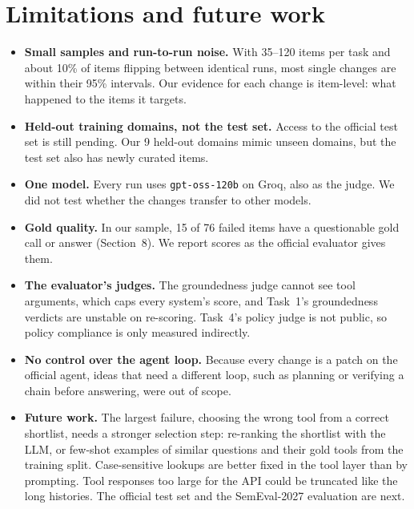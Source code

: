 \documentclass[10pt]{article}
\begin{document}
\section{Limitations and future work}
\begin{itemize}
\item \textbf{Small samples and run-to-run noise.} With 35--120 items per task and about 10\% of
  items flipping between identical runs, most single changes are within their 95\% intervals.
  Our evidence for each change is item-level: what happened to the items it targets.
\item \textbf{Held-out training domains, not the test set.} Access to the official test set is
  still pending. Our 9 held-out domains mimic unseen domains, but the test set also has newly
  curated items.
\item \textbf{One model.} Every run uses \texttt{gpt-oss-120b} on Groq, also as the judge. We did
  not test whether the changes transfer to other models.
\item \textbf{Gold quality.} In our sample, 15 of 76 failed items have a questionable gold call or
  answer (Section~8). We report scores as the official evaluator gives them.
\item \textbf{The evaluator's judges.} The groundedness judge cannot see tool arguments, which caps
  every system's score, and Task~1's groundedness verdicts are unstable on re-scoring. Task~4's
  policy judge is not public, so policy compliance is only measured indirectly.
\item \textbf{No control over the agent loop.} Because every change is a patch on the official
  agent, ideas that need a different loop, such as planning or verifying a chain before
  answering, were out of scope.
\item \textbf{Future work.} The largest failure, choosing the wrong tool from a correct
  shortlist, needs a stronger selection step: re-ranking the shortlist with the LLM, or few-shot
  examples of similar questions and their gold tools from the training split. Case-sensitive
  lookups are better fixed in the tool layer than by prompting. Tool responses too large for the
  API could be truncated like the long histories. The official test set and the SemEval-2027
  evaluation are next.
\end{itemize}
\end{document}

